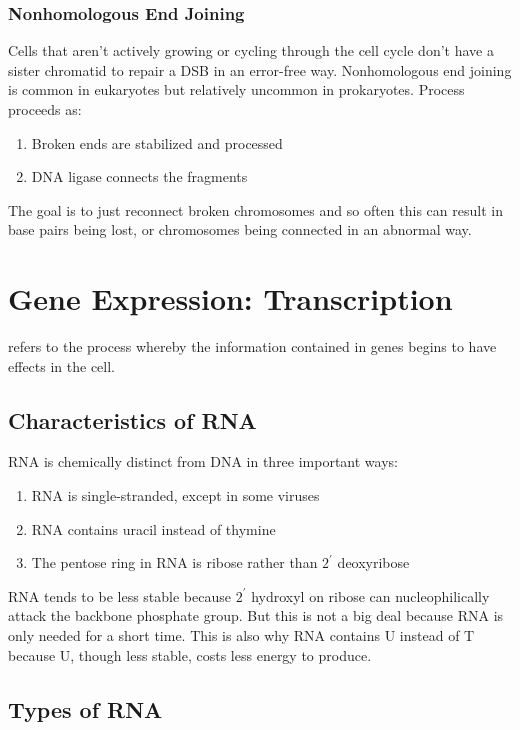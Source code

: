 \documentclass[../Bio_chemistryReview.tex]{subfiles}
\begin{document}
\subsubsection{Nonhomologous End Joining}
Cells that aren't actively growing or cycling through the cell cycle don't have
a sister chromatid to repair a DSB in an error-free way. Nonhomologous end
joining is common in eukaryotes but relatively uncommon in prokaryotes. Process
proceeds as:
\begin{enumerate}
  \item Broken ends are stabilized and processed
  \item DNA ligase connects the fragments
\end{enumerate}
The goal is to just reconnect broken chromosomes and so often this can result in
base pairs being lost, or chromosomes being connected in an abnormal way.

\section{Gene Expression: Transcription}
 refers to the process whereby the information
contained in genes begins to have effects in the cell.

\subsection{Characteristics of RNA}
RNA is chemically distinct from DNA in three important ways:
\begin{enumerate}
  \item RNA is single-stranded, except in some viruses
  \item RNA contains uracil instead of thymine
  \item The pentose ring in RNA is ribose rather than $ 2^{\prime} $ deoxyribose
\end{enumerate}
RNA tends to be less stable because $ 2^{\prime} $ hydroxyl on ribose can
nucleophilically attack the backbone phosphate group. But this is not a big deal
because RNA is only needed for a short time. This is also why RNA contains U
instead of T because U, though less stable, costs less energy to produce.

\subsection{Types of RNA}
\end{document}

